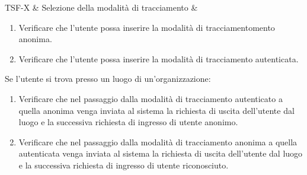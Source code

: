 

TSF-X & Selezione della modalità di tracciamento & \begin{enumerate}
    \item Verificare che l'utente possa inserire la modalità di tracciamentomento anonima.
    \item Verificare che l'utente possa inserire la modalità di tracciamento autenticata.
\end{enumerate}
Se l'utente si trova presso un luogo di un'organizzazione:
\begin{enumerate}
    \item Verificare che nel passaggio dalla modalità di tracciamento autenticato a quella anonima venga inviata al sistema la richiesta di uscita dell'utente dal luogo e la successiva richiesta di ingresso di utente anonimo.
    \item Verificare che nel passaggio dalla modalità di tracciamento anonima a quella autenticata venga inviata al sistema la richiesta di uscita dell'utente dal luogo e la successiva richiesta di ingresso di utente riconosciuto.
\end{enumerate} \\

